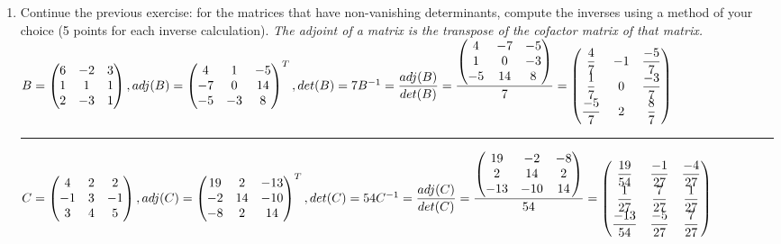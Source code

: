 \documentclass[fleqn]{article}
\begin{document}
\begin{enumerate}
  \item Continue the previous exercise: for the matrices that have non-vanishing determinants, compute the inverses using a method of your choice (5 points for each inverse calculation). 
    \textcolor{hwColor}{
      \emph{The adjoint of a matrix is the transpose of the cofactor matrix of that matrix.}
        $
          B=\begin{pmatrix}
            6 & -2 & 3 \\ 
            1 & 1 & 1 \\ 
            2 & -3 & 1
          \end{pmatrix}
          ,
          adj(B)=
          \begin{pmatrix}
          4 & 1 & -5 \\
          -7 & 0 & 14 \\
          -5 & -3 & 8
          \end{pmatrix}^T \\
          ,
          det(B)=7
        B^{-1}= \dfrac{adj(B)}{det(B)}=\dfrac{
          \begin{pmatrix}
            4 & -7 & -5 \\
            1 & 0 & -3 \\
            -5 & 14 & 8
          \end{pmatrix}
        }{7}=
        \begin{pmatrix}
          \dfrac{4}{7} & -1 & \dfrac{-5}{7} \\
          \dfrac{1}{7} & 0 & \dfrac{-3}{7} \\
          \dfrac{-5}{7} & 2 & \dfrac{8}{7}
        \end{pmatrix}
      $
    }

    \rule{16cm}{0.4pt}

    \textcolor{hwColor}{
      $
        C=\begin{pmatrix}
          4 & 2 & 2 \\ 
          -1 & 3 & -1 \\ 
          3 & 4 & 5
        \end{pmatrix}
        ,
        adj(C)=
        \begin{pmatrix}
        19 & 2 & -13 \\
        -2 & 14 & -10 \\
        -8 & 2 & 14
        \end{pmatrix}^T
        ,
        det(C)=54 \\
      C^{-1}= \dfrac{adj(C)}{det(C)}=\dfrac{
        \begin{pmatrix}
          19 & -2 & -8 \\
          2 & 14 & 2 \\
          -13 & -10 & 14
        \end{pmatrix}
      }{54}
      =
      \begin{pmatrix}
        \dfrac{19}{54} & \dfrac{-1}{27} & \dfrac{-4}{27} \\
        \dfrac{1}{27} & \dfrac{7}{27} & \dfrac{1}{27} \\
        \dfrac{-13}{54} & \dfrac{-5}{27} & \dfrac{7}{27}
      \end{pmatrix}
      $
    }


\end{enumerate}
\end{document}
